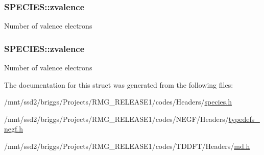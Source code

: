 \hypertarget{struct_s_p_e_c_i_e_s_a3b02cd8e29922454737ecb5ef7be5016}{
\subsubsection[{zvalence}]{ S\-P\-E\-C\-I\-E\-S\-::zvalence}}\label{struct_s_p_e_c_i_e_s_a3b02cd8e29922454737ecb5ef7be5016}
Number of valence electrons \hypertarget{struct_s_p_e_c_i_e_s_a2596f8ed233b9e49864f86ef944f107a}{
\subsubsection[{zvalence}]{ S\-P\-E\-C\-I\-E\-S\-::zvalence}}\label{struct_s_p_e_c_i_e_s_a2596f8ed233b9e49864f86ef944f107a}
Number of valence electrons 

The documentation for this struct was generated from the following files\-:\begin{DoxyCompactItemize}
\item 
/mnt/ssd2/briggs/\-Projects/\-R\-M\-G\-\_\-\-R\-E\-L\-E\-A\-S\-E1/codes/\-Headers/\hyperlink{species_8h}{species.\-h}\item 
/mnt/ssd2/briggs/\-Projects/\-R\-M\-G\-\_\-\-R\-E\-L\-E\-A\-S\-E1/codes/\-N\-E\-G\-F/\-Headers/\hyperlink{typedefs__negf_8h}{typedefs\-\_\-negf.\-h}\item 
/mnt/ssd2/briggs/\-Projects/\-R\-M\-G\-\_\-\-R\-E\-L\-E\-A\-S\-E1/codes/\-T\-D\-D\-F\-T/\-Headers/\hyperlink{md_8h}{md.\-h}\end{DoxyCompactItemize}

